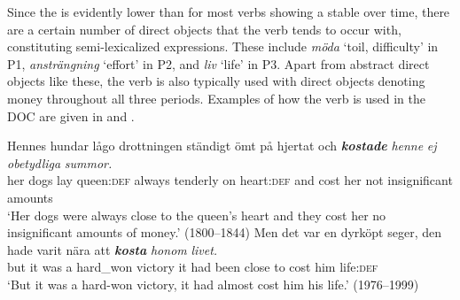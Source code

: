 \documentclass[output=paper]{langscibook}
\begin{document}
\begin{table}
\caption{Frequency measures of the verb-specific DOC with \textit{kosta} ‘cost’}
\label{tab:valdeson:17}
\end{table}

Since the  is evidently lower than for most verbs showing a stable  over time, there are a certain number of direct objects that the verb tends to occur with, constituting semi-lexicalized expressions. These include \textit{möda} ‘toil, difficulty’ in P1, \textit{ansträngning} ‘effort’ in P2, and \textit{liv} ‘life’ in P3. Apart from abstract direct objects like these, the verb is also typically used with direct objects denoting money throughout all three periods. Examples of how the verb is used in the DOC are given in  and .


\ea \label{ex:valdeson:26}
\gll Hennes hundar  lågo  drottningen  ständigt  ömt       på  hjertat {och} \textbf{\textit{kostade}} \textit{henne} \textit{ej} \textit{obetydliga} \textit{summor.}\\
  her         dogs       lay     queen\textsc{:def}     always   tenderly on heart:\textsc{def} and   cost         her   not   insignificant     amounts\\
\glt ‘Her dogs were always close to the queen’s heart and they cost her no insignificant amounts of money.’ (1800–1844)
\ex \label{ex:valdeson:27}
\gll Men   det   var   en   dyrköpt     seger,   den   hade   varit   nära {att} \textbf{\textit{kosta}} \textit{honom}   \textit{livet.}\\
  but       it           was     a   hard\_won  victory   it  had  been close to   cost       him     life:\textsc{def}\\
\glt `But it was a hard-won victory, it had almost cost him his life.’ (1976–1999)
\z
\end{document}
